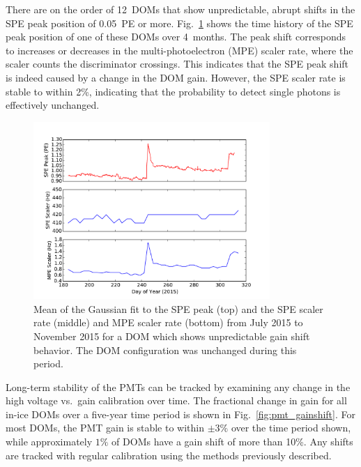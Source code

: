 There are on the order of 12~DOMs that show unpredictable, abrupt shifts in the SPE peak
position of 0.05~PE or more. Fig.~\ref{fig:gainshift_spe} shows the time history of the
SPE peak position of one of these DOMs over 4~months. The peak shift
corresponds to increases or decreases in the multi-photoelectron (MPE)
scaler rate, where the scaler counts the discriminator crossings.  This
indicates that the SPE peak shift is indeed caused by a change in the DOM
gain. However, the SPE scaler rate is stable to within 2\%, indicating that the
probability to detect single photons is effectively unchanged.

\begin{figure}[!h]
 \centering
 \includegraphics[width=0.8\textwidth]{graphics/dom/reliability/gainshift.pdf}
 \caption{Mean of the Gaussian fit to the SPE peak (top) and the SPE
   scaler rate (middle) and MPE
   scaler rate (bottom) from July 2015 to November 2015 for a DOM
   which shows unpredictable gain shift behavior. The DOM
   configuration was unchanged during this period.}
 \label{fig:gainshift_spe}
\end{figure}

Long-term stability of the PMTs can be tracked by examining any change in
the high voltage vs.~gain calibration over time.  The fractional change in gain for
all in-ice DOMs over a five-year time period is shown in
Fig.~\ref{fig:pmt_gainshift}.  For most DOMs, the PMT gain is stable to
within $\pm3\%$ over the time period shown, while approximately $1\%$ 
of DOMs have a gain shift of more than 10\%.  Any shifts are tracked with
regular calibration using the methods previously described.

